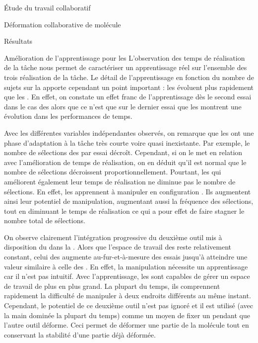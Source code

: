 \documentclass[myfrancais]{mythesis}
\begin{document}
\begin{mypart}{Étude du travail collaboratif}
\begin{mychapter}{Déformation collaborative de molécule}
\begin{mysection}{Résultats}
\begin{mysubsection}{Amélioration de l'apprentissage pour les }
					L'observation des temps de réalisation de la tâche  nous permet de caractériser un apprentissage réel sur l'ensemble des trois réalisation de la tâche.
					Le détail de l'apprentissage en fonction du nombre de sujets sur la  apporte cependant un point important : les  évoluent plus rapidement que les .
					En effet, on constate un effet franc de l'apprentissage dès le second essai dans le cas des  alors que ce n'est que sur le dernier essai que les  montrent une évolution dans les performances de temps.

					Avec les différentes variables indépendantes observés, on remarque que les  ont une phase d'adaptation à la tâche très courte voire quasi inexistante.
					Par exemple, le nombre de sélections des  par essai décroît.
					Cependant, si on le met en relation avec l'amélioration de temps de réalisation, on en déduit qu'il est normal que le nombre de sélections décroissent proportionnellement.
					Pourtant, les  qui améliorent également leur temps de réalisation ne diminue pas le nombre de sélections.
					En effet, les  apprennent à manipuler en configuration .
					Ils augmentent ainsi leur potentiel de manipulation, augmentant aussi la fréquence des sélections, tout en diminuant le temps de réalisation ce qui a pour effet de faire stagner le nombre total de sélections.

					On observe clairement l'intégration progressive du deuxième outil mis à disposition du  dans la .
					Alors que l'espace de travail des  reste relativement constant, celui des  augmente au-fur-et-à-mesure des essais jusqu'à atteindre une valeur similaire à celle des .
					En effet, la manipulation  nécessite un apprentissage car il n'est pas intuitif.
					Avec l'apprentissage, les  sont capables de gérer un espace de travail de plus en plus grand.
					La plupart du temps, ils comprennent rapidement la difficulté de manipuler à deux endroits différents au même instant.
					Cependant, le potentiel de ce deuxième outil n'est pas ignoré et il est utilisé (avec la main dominée la plupart du temps) comme un moyen de fixer un  pendant que l'autre outil déforme.
					Ceci permet de déformer une partie de la molécule tout en conservant la stabilité d'une partie déjà déformée.


\end{mysubsection}
\end{mysection}
\end{mychapter}
\end{mypart}
\end{document}
